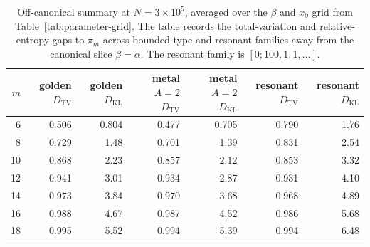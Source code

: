\begin{table}[H]
\centering
\scriptsize
\setlength{\tabcolsep}{4pt}
\caption{Off-canonical summary at \(N=3\times 10^5\), averaged over the
\(\beta\) and \(x_0\) grid from Table~\ref{tab:parameter-grid}. The table
records the total-variation and relative-entropy gaps to \(\pi_m\) across
bounded-type and resonant families away from the canonical slice
\(\beta=\alpha\). The resonant family is \([0;100,1,1,\dots]\).}
\label{tab:rotation-parry-gap-summary}
\begin{tabular}{rrrrrrr}
\toprule
\(m\) & golden \(D_{\mathrm{TV}}\) & golden \(D_{\mathrm{KL}}\) & metal \(A=2\) \(D_{\mathrm{TV}}\) & metal \(A=2\) \(D_{\mathrm{KL}}\) & resonant \(D_{\mathrm{TV}}\) & resonant \(D_{\mathrm{KL}}\)\\
\midrule
6  & 0.506 & 0.804 & 0.477 & 0.705 & 0.790 & 1.76\\
8  & 0.729 & 1.48  & 0.701 & 1.39  & 0.831 & 2.54\\
10 & 0.868 & 2.23  & 0.857 & 2.12  & 0.853 & 3.32\\
12 & 0.941 & 3.01  & 0.934 & 2.87  & 0.931 & 4.10\\
14 & 0.973 & 3.84  & 0.970 & 3.68  & 0.968 & 4.89\\
16 & 0.988 & 4.67  & 0.987 & 4.52  & 0.986 & 5.68\\
18 & 0.995 & 5.52  & 0.994 & 5.39  & 0.994 & 6.48\\
\bottomrule
\end{tabular}
\end{table}
